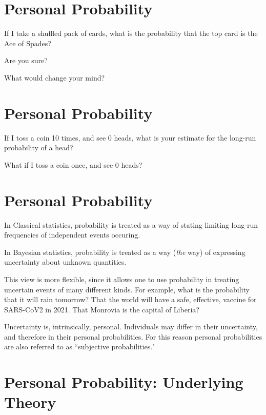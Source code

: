 
\section*{\hfil Personal Probability}

If I take a shuffled pack of cards, what is the probability
that the top card is the Ace of Spades? 

Are you sure?

What would change your mind?

\es\bs

\section*{\hfil Personal Probability}

If I toss a coin 10 times, and see 0 heads, what is your estimate
for the long-run probability of a head?

What if I toss a coin once, and see 0 heads?

\es\bs

\section*{\hfil Personal Probability}

In Classical statistics, probability is treated as a way of stating
limiting long-run frequencies of independent events occuring.

In Bayesian statistics, probability is treated as a way ({\it the} way)
of expressing uncertainty about unknown quantities.

This view is more flexible, since it allows one to use
probability in treating uncertain events of many different kinds.
For example, what is the probability 
that it will rain tomorrow? That the world will have a safe, effective,
vaccine for SARS-CoV2 in 2021. 
That Monrovia is the capital of Liberia?

Uncertainty is, intrinsically, personal. Individuals may differ in their uncertainty, and therefore
in their personal probabilities.   For this reason personal probabilities are also
referred to as ``subjective probabilities." 

\es\bs

\section*{Personal Probability: Underlying Theory}

